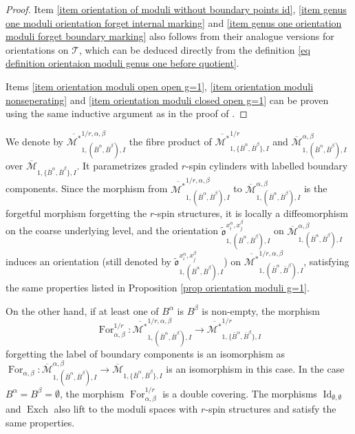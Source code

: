 \documentclass[11pt,a4paper]{article}
\theoremstyle{definition}
\theoremstyle{remark}
\numberwithin{equation}{section}
\DeclareMathOperator{\Id}{Id}
\def\Mbar{{\overline{\mathcal M}}}
\def\Mbarstar{{\overline{\mathcal M^*}}}
\begin{document}
\begin{proof}
    Item \ref{item orientation of moduli without boundary points id}, \ref{item genus one moduli orientation forget internal marking} and \ref{item genus one orientation moduli forget boundary marking} also follows from their analogue versions for orientations on $\mathcal T$, which can be deduced directly from the definition \eqref{eq definition orientaion moduli genus one before quotient}.

    Items \ref{item orientation moduli open open g=1}, \ref{item orientation moduli nonseperating} and \ref{item orientation moduli closed open g=1} can be proven using the same inductive argument as in the proof of \cite[Lemma 3.15]{BCT1}.
\end{proof}

We denote by $\Mbarstar^{1/r,\alpha,\beta}_{1,(\bar{B}^\alpha,\bar{B}^\beta),I}$ the fibre product of  $\Mbarstar^{1/r}_{1,\{\bar{B}^\alpha,\bar{B}^\beta\},I}$  and  $\Mbar^{\alpha,\beta}_{1,(\bar{B}^\alpha,\bar{B}^\beta),I}$ over $\Mbar^{}_{1,\{\bar{B}^\alpha,\bar{B}^\beta\},I}$. It parametrizes graded $r$-spin cylinders with labelled boundary components. 
Since the morphism from $\Mbarstar^{1/r,\alpha,\beta}_{1,(\bar{B}^\alpha,\bar{B}^\beta),I}$ to $\Mbar^{\alpha,\beta}_{1,(\bar{B}^\alpha,\bar{B}^\beta),I}$ is the forgetful morphism forgetting the $r$-spin structures, it is locally a diffeomorphism on the coarse underlying level, and the orientation $\tilde{\mathfrak o}^{x^\alpha_i,x^\beta_j}_{1,(\bar{B}^\alpha,\bar{B}^\beta),I}$ on $\Mbar^{\alpha,\beta}_{1,(\bar{B}^\alpha,\bar{B}^\beta),I}$ induces an orientation (still denoted by $\tilde{\mathfrak o}^{x^\alpha_i,x^\beta_j}_{1,(\bar{B}^\alpha,\bar{B}^\beta),I}$) on $\Mbarstar^{1/r,\alpha,\beta}_{1,(\bar{B}^\alpha,\bar{B}^\beta),I}$, satisfying the same properties listed in Proposition \ref{prop orientation moduli g=1}.

On the other hand, if at least one of $B^\alpha$ is $B^\beta$ is non-empty, the morphism $$\operatorname{For}^{1/r}_{\alpha,\beta}\colon \Mbarstar^{1/r,\alpha,\beta}_{1,(\bar{B}^\alpha,\bar{B}^\beta),I} \to \Mbarstar^{1/r}_{1,\{\bar{B}^\alpha,\bar{B}^\beta\},I}$$ 
forgetting the label of boundary components is an isomorphism as  $\operatorname{For}^{}_{\alpha,\beta} \colon \Mbar^{\alpha,\beta}_{1,(\bar{B}^\alpha,\bar{B}^\beta),I}\to \Mbar^{}_{1,\{\bar{B}^\alpha,\bar{B}^\beta\},I}$ is an isomorphism in this case. 
In the case $B^\alpha=B^\beta=\emptyset$, the morphism $\operatorname{For}^{1/r}_{\alpha,\beta}$ is a double covering. The morphisms $\Id_{\emptyset,\emptyset}$ and $\operatorname{Exch}$ also lift to the  moduli spaces with $r$-spin structures and satisfy the same properties.
\end{document}
